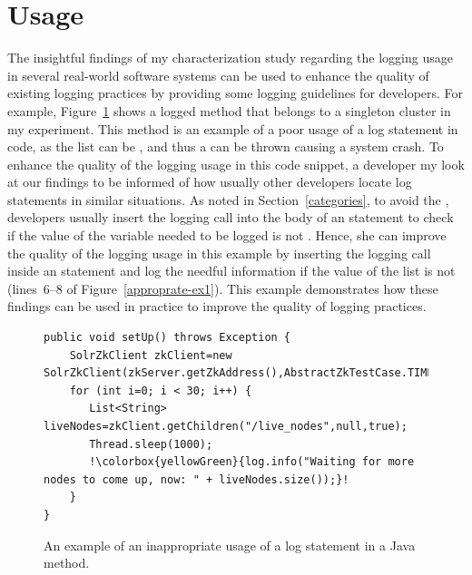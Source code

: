 \section{Usage}  \label{usageELUS}
The insightful findings of my characterization study regarding the logging usage in several real-world software systems can be used to enhance the quality of existing logging practices by providing some logging guidelines for developers. For example, Figure~\ref{inapproprate-ex1} shows a logged method that belongs to a singleton cluster in my experiment. This  method is an example of a poor usage of a log statement in code, as the list  can be , and thus a  can be thrown causing a system crash. To enhance the quality of the logging usage in this code snippet, a developer my look at our findings to be informed of how usually other developers locate log statements in similar situations. As noted in Section~\ref{categories}, to avoid the , developers usually insert the logging call into the body of an  statement to check if the value of the variable needed to be logged is not . Hence, she can improve the quality of the logging usage in this example by inserting the logging call inside an  statement and log the needful information if the value of the list  is not  (lines~6--8 of Figure~\ref{approprate-ex1}). This example demonstrates how these findings can be used in practice to improve the quality of logging practices.


\begin{figure}[p]
\def\baselinestretch{1}
\begin{lstlisting}[escapechar=!]
public void setUp() throws Exception {
    SolrZkClient zkClient=new SolrZkClient(zkServer.getZkAddress(),AbstractZkTestCase.TIMEOUT);
    for (int i=0; i < 30; i++) {
       List<String> liveNodes=zkClient.getChildren("/live_nodes",null,true);
       Thread.sleep(1000);
       !\colorbox{yellowGreen}{log.info("Waiting for more nodes to come up, now: " + liveNodes.size());}!
    }
}
\end{lstlisting}
\caption[Example 1: An example of an inappropriate usage of a log statement in a Java method.]{An example of an inappropriate usage of a log statement in a Java method.\label{inapproprate-ex1}}
\end{figure}



